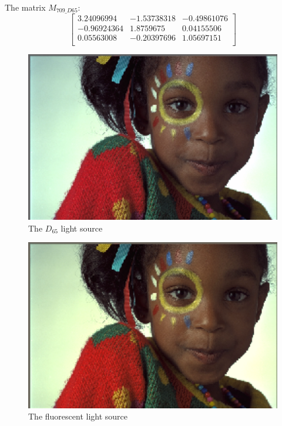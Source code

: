 \documentclass{article}
\begin{document}
The matrix $M_{709\_D65}$:
\begin{equation*}
\begin{bmatrix}
  3.24096994 & -1.53738318 & -0.49861076\\
  -0.96924364 & 1.8759675 & 0.04155506\\
  0.05563008 & -0.20397696 & 1.05697151\\
\end{bmatrix}
\end{equation*}

\begin{figure}[H]
    \centering
    \includegraphics[width=1\textwidth]{../4-d65-illum1.png}
    \caption{The $D_{65}$ light source}
\end{figure}
\begin{figure}[H]
    \centering
    \includegraphics[width=1\textwidth]{../4-d65-illum2.png}
    \caption{The fluorescent light source}
\end{figure}
\end{document}
